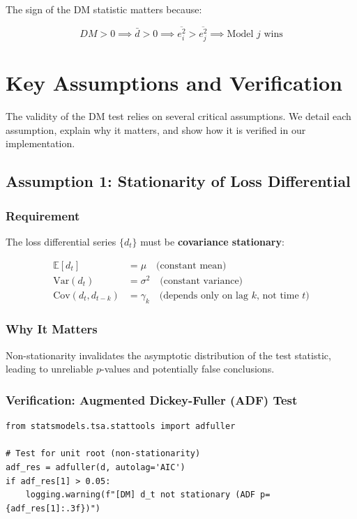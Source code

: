 \documentclass[11pt,a4paper]{article}
\begin{document}
The sign of the DM statistic matters because:

\begin{equation}
DM > 0 \implies \bar{d} > 0 \implies \overline{e_i^2} > \overline{e_j^2} \implies \text{Model } j \text{ wins}
\end{equation}

\section{Key Assumptions and Verification}

The validity of the DM test relies on several critical assumptions. We detail each assumption, explain why it matters, and show how it is verified in our implementation.

\subsection{Assumption 1: Stationarity of Loss Differential}

\subsubsection*{Requirement}

The loss differential series $\{d_t\}$ must be \textbf{covariance stationary}:

\begin{align}
\mathbb{E}[d_t] &= \mu \quad \text{(constant mean)} \\
\text{Var}(d_t) &= \sigma^2 \quad \text{(constant variance)} \\
\text{Cov}(d_t, d_{t-k}) &= \gamma_k \quad \text{(depends only on lag } k\text{, not time } t\text{)}
\end{align}

\subsubsection*{Why It Matters}

Non-stationarity invalidates the asymptotic distribution of the test statistic, leading to unreliable $p$-values and potentially false conclusions.

\subsubsection*{Verification: Augmented Dickey-Fuller (ADF) Test}

\begin{lstlisting}[caption={ADF Test Implementation}]
from statsmodels.tsa.stattools import adfuller

# Test for unit root (non-stationarity)
adf_res = adfuller(d, autolag='AIC')
if adf_res[1] > 0.05:
    logging.warning(f"[DM] d_t not stationary (ADF p={adf_res[1]:.3f})")
\end{lstlisting}
\end{document}
